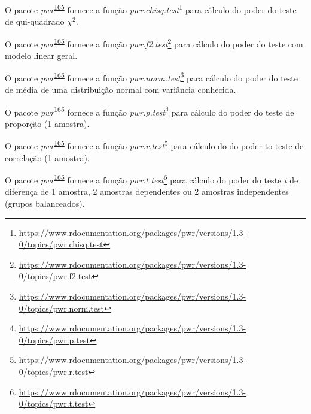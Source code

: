 \documentclass[
  a4paper,
]{book}
\renewcommand{\href}[2]{#2\footnote{\url{#1}}}
\newenvironment{infobox}[1]
  {
  \begin{itemize}
  \renewcommand{\labelitemi}{
    \raisebox{-.7\height}[0pt][0pt]{
      {\setkeys{Gin}{width=3em,keepaspectratio}
        \texttt{[image: \#1]}}
    }
  }
  \setlength{\fboxsep}{1em}
  \begin{blackbox}
  \item
  }
  {
  \end{blackbox}
  \end{itemize}
  }
\begin{document}
\begin{infobox}{images/Rlogo}
O pacote \emph{pwr}\textsuperscript{\protect\hyperlink{ref-pwr}{165}} fornece a função \href{https://www.rdocumentation.org/packages/pwr/versions/1.3-0/topics/pwr.chisq.test}{\emph{pwr.chisq.test}} para cálculo do poder do teste de qui-quadrado \(\chi^2\).

\end{infobox}

\begin{infobox}{images/Rlogo}
O pacote \emph{pwr}\textsuperscript{\protect\hyperlink{ref-pwr}{165}} fornece a função \href{https://www.rdocumentation.org/packages/pwr/versions/1.3-0/topics/pwr.f2.test}{\emph{pwr.f2.test}} para cálculo do poder do teste com modelo linear geral.

\end{infobox}

\begin{infobox}{images/Rlogo}
O pacote \emph{pwr}\textsuperscript{\protect\hyperlink{ref-pwr}{165}} fornece a função \href{https://www.rdocumentation.org/packages/pwr/versions/1.3-0/topics/pwr.norm.test}{\emph{pwr.norm.test}} para cálculo do poder do teste de média de uma distribuição normal com variância conhecida.

\end{infobox}

\begin{infobox}{images/Rlogo}
O pacote \emph{pwr}\textsuperscript{\protect\hyperlink{ref-pwr}{165}} fornece a função \href{https://www.rdocumentation.org/packages/pwr/versions/1.3-0/topics/pwr.p.test}{\emph{pwr.p.test}} para cálculo do poder do teste de proporção (1 amostra).

\end{infobox}

\begin{infobox}{images/Rlogo}
O pacote \emph{pwr}\textsuperscript{\protect\hyperlink{ref-pwr}{165}} fornece a função \href{https://www.rdocumentation.org/packages/pwr/versions/1.3-0/topics/pwr.r.test}{\emph{pwr.r.test}} para cálculo do do poder to teste de correlação (1 amostra).

\end{infobox}

\begin{infobox}{images/Rlogo}
O pacote \emph{pwr}\textsuperscript{\protect\hyperlink{ref-pwr}{165}} fornece a função \href{https://www.rdocumentation.org/packages/pwr/versions/1.3-0/topics/pwr.t.test}{\emph{pwr.t.test}} para cálculo do poder do teste \emph{t} de diferença de 1 amostra, 2 amostras dependentes ou 2 amostras independentes (grupos balanceados).

\end{infobox}
\end{document}
